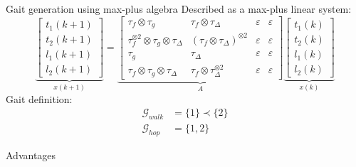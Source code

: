 \documentclass{beamer}
\renewcommand{\cite}[1]{\footnote<.->[frame]{\fullcite{#1}}}
\begin{document}
\begin{frame}{Gait generation using max-plus algebra}
	Described as a max-plus linear system:
	\begin{equation*}
		\underbrace{	\begin{bmatrix}
		t_1 (k+1) \\
		t_2 (k+1) \\
		l_1 (k+1) \\
		l_2 (k+1)
		\end{bmatrix}}_{x(k+1)} = 
		\underbrace{\begin{bmatrix}
		\tau_f \otimes \tau_g & \tau_f \otimes \tau_\Delta 	& \varepsilon & \varepsilon \\
		\tau_f^{\otimes 2} \otimes \tau_g \otimes \tau_\Delta & (\tau_f \otimes \tau_\Delta)^{\otimes 2} & \varepsilon & \varepsilon \\
		\tau_g & \tau_\Delta & \varepsilon & \varepsilon \\
		\tau_f \otimes \tau_g \otimes \tau_\Delta & \tau_f \otimes \tau_\Delta^{\otimes 2} & \varepsilon & \varepsilon
		\end{bmatrix}}_{A}
		\underbrace{\begin{bmatrix}
			t_1 (k) \\
			t_2 (k) \\
			l_1 (k) \\
			l_2 (k)
		\end{bmatrix}}_{x(k)}
	\end{equation*}
	Gait definition:
	\begin{align*}
		\mathcal{G}_{walk} &= \{1\} \prec \{2\} \\
		\mathcal{G}_{hop} &= \{1,2\}
	\end{align*}
\end{frame}

\begin{frame}{Advantages}
\end{frame}

\end{document}
